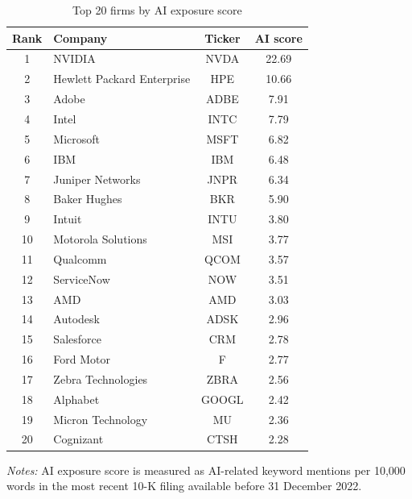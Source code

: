 \begin{table}[htbp]
\centering
\caption{Top 20 firms by AI exposure score}
\label{tab:top20-ai-exposure}
\small
\begin{threeparttable}
\begin{tabular}{clcc}
\toprule
Rank & Company & Ticker & AI score \\
\midrule
1  & NVIDIA                    & NVDA  & 22.69 \\
2  & Hewlett Packard Enterprise & HPE   & 10.66 \\
3  & Adobe                     & ADBE  & 7.91 \\
4  & Intel                     & INTC  & 7.79 \\
5  & Microsoft                 & MSFT  & 6.82 \\
6  & IBM                       & IBM   & 6.48 \\
7  & Juniper Networks          & JNPR  & 6.34 \\
8  & Baker Hughes              & BKR   & 5.90 \\
9  & Intuit                    & INTU  & 3.80 \\
10 & Motorola Solutions        & MSI   & 3.77 \\
11 & Qualcomm                  & QCOM  & 3.57 \\
12 & ServiceNow                & NOW   & 3.51 \\
13 & AMD                       & AMD   & 3.03 \\
14 & Autodesk                  & ADSK  & 2.96 \\
15 & Salesforce                & CRM   & 2.78 \\
16 & Ford Motor                & F     & 2.77 \\
17 & Zebra Technologies        & ZBRA  & 2.56 \\
18 & Alphabet                  & GOOGL & 2.42 \\
19 & Micron Technology         & MU    & 2.36 \\
20 & Cognizant                 & CTSH  & 2.28 \\
\bottomrule
\end{tabular}
\begin{tablenotes}[flushleft]
\footnotesize
\item \textit{Notes:} AI exposure score is measured as AI-related keyword mentions per 10,000 words in the most recent 10-K filing available before 31 December 2022.
\end{tablenotes}
\end{threeparttable}
\end{table}

